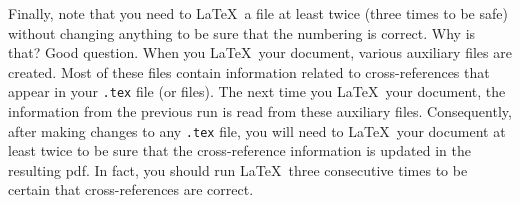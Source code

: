 Finally, note that you need to \LaTeX\ a file at least twice (three times to
be safe) without changing anything to be sure that the numbering is correct.
Why is that? Good question.
When you \LaTeX\ your document, various auxiliary files are created. Most of these files contain
information related to cross-references that appear in your {\tt .tex} file (or files). The next time you 
\LaTeX\ your document, the information from the previous run is read from
these auxiliary files. Consequently, after making changes to any {\tt .tex}
file, you will need to \LaTeX\ your document at least twice to be sure that the
cross-reference information is updated in the resulting pdf. In fact, you should
run \LaTeX\ three consecutive times to be certain that cross-references are correct.

